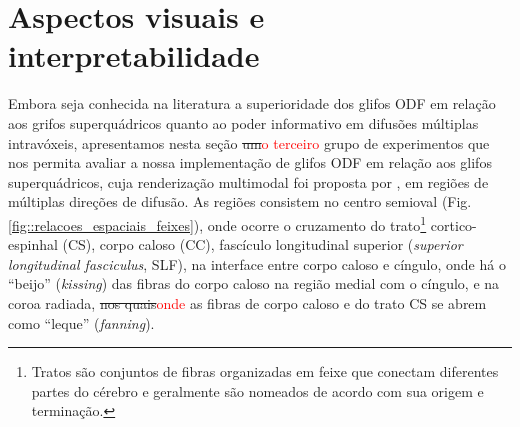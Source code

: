 \section{Aspectos visuais e interpretabilidade}
\label{sec::aspectos_visuais_e_interpretabilidade}



Embora seja conhecida na literatura a superioridade dos glifos ODF em relação aos grifos superquádricos quanto ao poder informativo em difusões múltiplas intravóxeis, apresentamos nesta seção \sout{um}\textcolor{red}{o terceiro} grupo de experimentos que nos permita avaliar a nossa implementação de glifos ODF em relação aos glifos superquádricos, cuja renderização multimodal foi proposta por , em regiões de múltiplas direções de difusão. As regiões consistem no centro semioval (Fig. \ref{fig::relacoes_espaciais_feixes}), onde ocorre o cruzamento do trato\footnote{Tratos são conjuntos de fibras organizadas em feixe que conectam diferentes partes do cérebro e geralmente são nomeados de acordo com sua origem e terminação.} cortico-espinhal (CS), corpo caloso (CC), fascículo longitudinal superior (\textit{superior longitudinal fasciculus}, SLF), na interface entre corpo caloso e cíngulo, onde há o ``beijo'' (\textit{kissing}) das fibras do corpo caloso na região medial com o cíngulo, e na coroa radiada, \sout{nos quais}\textcolor{red}{onde} as fibras de corpo caloso e do trato CS se abrem como ``leque'' (\textit{fanning}).

